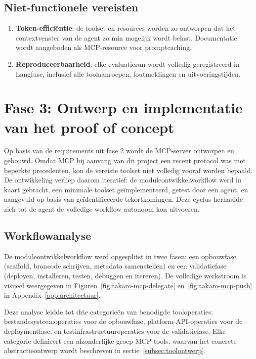 \subsection{Niet-functionele vereisten}\label{subsec:nfr}

\begin{enumerate}
    \item \textbf{Token-efficiëntie}: de toolset en resources worden zo ontworpen dat het contextvenster van de agent zo min mogelijk wordt belast. Documentatie wordt aangeboden als MCP-resource voor promptcaching.
    \item \textbf{Reproduceerbaarheid}: elke evaluatierun wordt volledig geregistreerd in Langfuse, inclusief alle toolaanroepen, foutmeldingen en uitvoeringstijden.
\end{enumerate}

\section{Fase 3: Ontwerp en implementatie van het proof of concept}\label{sec:fase3}

Op basis van de requirements uit fase 2 wordt de MCP-server ontworpen en gebouwd. Omdat MCP bij aanvang van dit project een recent protocol was met beperkte precedenten, kon de vereiste toolset niet volledig vooraf worden bepaald. De ontwikkeling verliep daarom iteratief: de moduleontwikkelworkflow werd in kaart gebracht, een minimale toolset geïmplementeerd, getest door een agent, en aangevuld op basis van geïdentificeerde tekortkomingen. Deze cyclus herhaalde zich tot de agent de volledige workflow autonoom kon uitvoeren.

\subsection{Workflowanalyse}\label{subsec:workflow}

De moduleontwikkelworkflow werd opgesplitst in twee fasen: een opbouwfase (scaffold, broncode schrijven, metadata samenstellen) en een validatiefase (deployen, installeren, testen, debuggen en itereren). De volledige werkstroom is visueel weergegeven in Figuren~\ref{fig:takaro-mcp-delegate} en~\ref{fig:takaro-mcp-push} in Appendix~\ref{app:architectuur}.

Deze analyse leidde tot drie categorieën van benodigde tooloperaties: bestandssysteemoperaties voor de opbouwfase, platform-API-operaties voor de deploymentfase, en testinfrastructuuroperaties voor de validatiefase. Elke categorie definieert een afzonderlijke groep MCP-tools, waarvan het concrete abstractieontwerp wordt beschreven in sectie~\ref{subsec:toolontwerp}.

